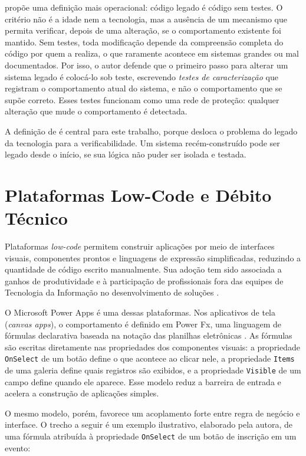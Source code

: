  propõe uma definição mais operacional: código legado é código sem testes. O critério não é a idade nem a tecnologia, mas a ausência de um mecanismo que permita verificar, depois de uma alteração, se o comportamento existente foi mantido. Sem testes, toda modificação depende da compreensão completa do código por quem a realiza, o que raramente acontece em sistemas grandes ou mal documentados. Por isso, o autor defende que o primeiro passo para alterar um sistema legado é colocá-lo sob teste, escrevendo \textit{testes de caracterização} que registram o comportamento atual do sistema, e não o comportamento que se supõe correto. Esses testes funcionam como uma rede de proteção: qualquer alteração que mude o comportamento é detectada.

A definição de  é central para este trabalho, porque desloca o problema do legado da tecnologia para a verificabilidade. Um sistema recém-construído pode ser legado desde o início, se sua lógica não puder ser isolada e testada.

\section{Plataformas Low-Code e Débito Técnico}
\label{sec:lowcode}

Plataformas \textit{low-code} permitem construir aplicações por meio de interfaces visuais, componentes prontos e linguagens de expressão simplificadas, reduzindo a quantidade de código escrito manualmente. Sua adoção tem sido associada a ganhos de produtividade e à participação de profissionais fora das equipes de Tecnologia da Informação no desenvolvimento de soluções \cite{silva2023lowcode,silva2024lowcode}.

O Microsoft Power Apps é uma dessas plataformas. Nos aplicativos de tela (\textit{canvas apps}), o comportamento é definido em Power Fx, uma linguagem de fórmulas declarativa baseada na notação das planilhas eletrônicas \cite{powerfxdocs}. As fórmulas são escritas diretamente nas propriedades dos componentes visuais: a propriedade \texttt{OnSelect} de um botão define o que acontece ao clicar nele, a propriedade \texttt{Items} de uma galeria define quais registros são exibidos, e a propriedade \texttt{Visible} de um campo define quando ele aparece. Esse modelo reduz a barreira de entrada e acelera a construção de aplicações simples.

O mesmo modelo, porém, favorece um acoplamento forte entre regra de negócio e interface. O trecho a seguir é um exemplo ilustrativo, elaborado pela autora, de uma fórmula atribuída à propriedade \texttt{OnSelect} de um botão de inscrição em um evento:

